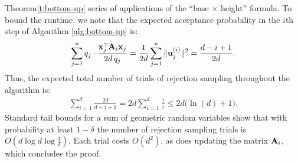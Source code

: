 \documentclass[12pt]{sty/colt2019/colt2018-arxiv}
\begin{document}
\begin{proofof}{Theorem}{\ref{t:bottom-up}}
series of applications of the ``base $\times$ height'' formula. To
bound the runtime, we note that the expected acceptance probability in
the $i$th step of Algorithm \ref{alg:bottom-up} is:
\begin{align*}
  \sum_{j=1}^nq_j\cdot \frac{\x_{j}^\top\A_i\x_j}{2d
  \,q_j}=\frac1{2d}\sum_{j=1}^n\|\u_{j}^{(i)}\|^2 = \frac{d-i+1}{2d}.
\end{align*}
Thus, the expected total number of trials of rejection sampling
throughout the algorithm is:
\begin{align*}
  \sum_{i=1}^d\frac{2d}{d-i+1} = 2d\sum_{i=1}^d\frac1i\leq 2d\big(\ln(d)+1\big).
\end{align*}
Standard tail bounds for a sum of geometric random variables show that
with probability at least $1-\delta$ the number of rejection sampling
trials is $O(d\log d\log\frac1\delta)$. Each trial costs
$O(d^2)$, as does updating the matrix $\mathbf A_i$, which concludes the proof.
\end{proofof}
\end{document}
